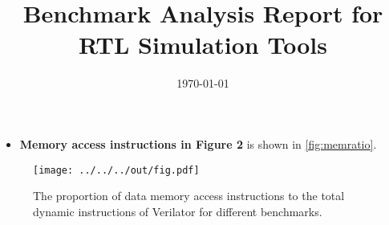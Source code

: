 \documentclass{article}
\title{Benchmark Analysis Report for RTL Simulation Tools}
\date{\today}
\begin{document}
\maketitle

\begin{itemize}[noitemsep,topsep=0pt]
    \item {\bf Memory access instructions in Figure 2} is shown in \autoref{fig:memratio}.
  \end{itemize}

\begin{figure}[h!]
  \centering
  \texttt{[image: ../../../out/fig.pdf]}
  \vspace*{-4mm}
  \caption{The proportion of data memory access instructions to the total dynamic instructions of Verilator for different benchmarks.}
  \label{fig:memratio}
\end{figure}
\end{document}
